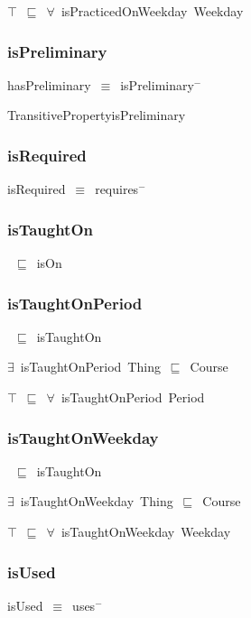 \documentclass{article}
\begin{document}
\ensuremath{\top}~\ensuremath{\sqsubseteq}~\ensuremath{\forall}~isPracticedOnWeekday~Weekday

\subsubsection*{isPreliminary}

hasPreliminary~\ensuremath{\equiv}~isPreliminary\ensuremath{^-}

TransitivePropertyisPreliminary

\subsubsection*{isRequired}

isRequired~\ensuremath{\equiv}~requires\ensuremath{^-}

\subsubsection*{isTaughtOn}

~\ensuremath{\sqsubseteq}~isOn

\subsubsection*{isTaughtOnPeriod}

~\ensuremath{\sqsubseteq}~isTaughtOn

\ensuremath{\exists}~isTaughtOnPeriod~Thing~\ensuremath{\sqsubseteq}~Course

\ensuremath{\top}~\ensuremath{\sqsubseteq}~\ensuremath{\forall}~isTaughtOnPeriod~Period

\subsubsection*{isTaughtOnWeekday}

~\ensuremath{\sqsubseteq}~isTaughtOn

\ensuremath{\exists}~isTaughtOnWeekday~Thing~\ensuremath{\sqsubseteq}~Course

\ensuremath{\top}~\ensuremath{\sqsubseteq}~\ensuremath{\forall}~isTaughtOnWeekday~Weekday

\subsubsection*{isUsed}

isUsed~\ensuremath{\equiv}~uses\ensuremath{^-}
\end{document}
